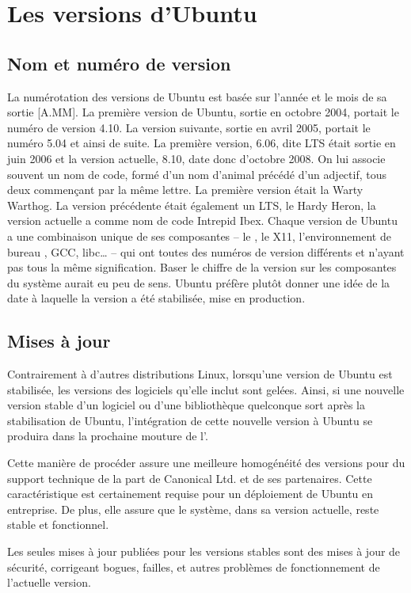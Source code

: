 \section{Les versions d'Ubuntu}
\label{RefVersionUbuntu}
\subsection{Nom et numéro de version}
La numérotation des versions de Ubuntu est basée sur l'année et le mois de sa sortie [A.MM]. La première version de Ubuntu, sortie en octobre 2004, portait le numéro de version 4.10. La version suivante, sortie en avril 2005, portait le numéro 5.04 et ainsi de suite. La première version, 6.06, dite LTS était sortie en juin 2006 et la version actuelle, 8.10, date donc d'octobre 2008. On lui associe souvent un nom de code, formé d'un nom d'animal précédé d'un adjectif, tous deux commençant par la même lettre. La première version était la Warty Warthog. %
La version précédente était également un LTS, le Hardy Heron, la version actuelle a comme nom de code Intrepid Ibex.
Chaque version de Ubuntu a une combinaison unique de ses composantes -- le , le  X11, l'environnement de bureau , GCC, libc\ldots{} -- qui ont toutes des numéros de version différents et n'ayant pas tous la même signification. Baser le chiffre de la version sur les composantes du système aurait eu peu de sens. Ubuntu préfère plutôt donner une idée de la date à laquelle la version a été stabilisée, mise en production.
\subsection{Mises à jour}
Contrairement à d'autres distributions Linux, lorsqu'une version de Ubuntu est stabilisée, les versions des logiciels qu'elle inclut sont gelées. Ainsi, si une nouvelle version stable d'un logiciel ou d'une bibliothèque quelconque sort après la stabilisation de Ubuntu, l'intégration de cette nouvelle version à Ubuntu se produira dans la prochaine mouture de l'.\par
Cette manière de procéder assure une meilleure homogénéité des versions pour du support technique de la part de Canonical Ltd. et de ses partenaires. Cette caractéristique est certainement requise pour un déploiement de Ubuntu en entreprise. De plus, elle assure que le système, dans sa version actuelle, reste stable et fonctionnel.\par
Les seules mises à jour publiées pour les versions stables sont des mises à jour de sécurité, corrigeant bogues, failles, et autres problèmes de fonctionnement de l'actuelle version.

